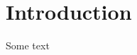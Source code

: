 \documentclass[12pt, class=report, crop=false]{standalone}
\begin{document}
\chapter{Introduction}%
\label{chap:intro}

Some text
\end{document}
